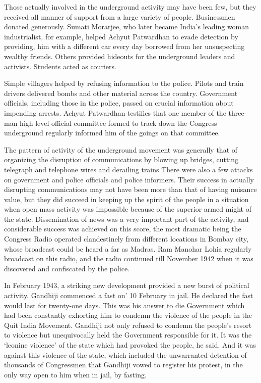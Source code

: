 Those actually involved in the underground activity may have been few, but they received all manner of support from a large variety of people. Businessmen donated generously. Sumati Morarjee, who later became India’s leading woman industrialist, for example, helped Achyut Patwardhan to evade detection by providing, him with a different car every day borrowed from her unsuspecting wealthy friends. Others provided hideouts for the underground leaders and activists. Students acted as couriers.

Simple villagers helped by refusing information to the police. Pilots and train drivers delivered bombs and other material across the country. Government officials, including those in the police, passed on crucial information about impending arrests. Achyut Patwardhan testifies that one member of the three-man high level official committee formed to track down the Congress underground regularly informed him of the goings on that committee.

The pattern of activity of the underground movement was generally that of organizing the disruption of communications by blowing up bridges, cutting telegraph and telephone wires and derailing trains There were also a few attacks on government and police officials and police informers. Their success in actually disrupting communications may not have been more than that of having nuisance value, but they did succeed in keeping up the spirit of the people in a situation when open mass activity was impossible because of the superior armed might of the state. Dissemination of news was a very important part of the activity, and considerable success was achieved on this score, the most dramatic being the Congress Radio operated clandestinely from different locations in Bombay city, whose broadcast could be heard a far as Madras. Ram Manohar Lohia regularly broadcast on this radio, and the radio continued till November 1942 when it was discovered and confiscated by the police.

In February 1943, a striking new development provided a new burst of political activity. Gandhiji commenced a fast on’ 10 February in jail. He declared the fast would last for twenty-one days. This was his answer to die Government which had been constantly exhorting him to condemn the violence of the people in the Quit India Movement. Gandhiji not only refused to condemn the people’s resort to violence but unequivocally held the Government responsible for it. It was the ‘leonine violence’ of the state which had provoked the people, he said. And it was against this violence of the state, which included the unwarranted detention of thousands of Congressmen that Gandhiji vowed to register his protest, in the only way open to him when in jail, by fasting.

